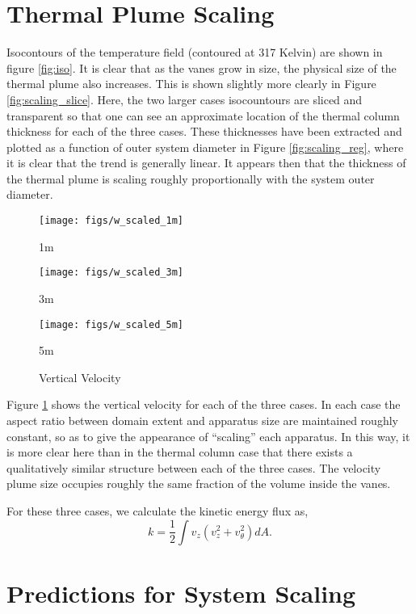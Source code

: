 \documentclass[english]{article}
\begin{document}
\section*{Thermal Plume Scaling}

Isocontours of the temperature field (contoured at 317 Kelvin) are shown in figure \ref{fig:iso}. 
It is clear that as the vanes grow in size, the physical size of the thermal plume also increases. This is shown slightly more clearly in
 Figure \ref{fig:scaling_slice}. Here, the two larger cases isocountours are sliced and transparent so that one can see an approximate 
location of the thermal column thickness for each of the three cases. These thicknesses have been extracted and plotted as a 
function of outer system diameter in Figure \ref{fig:scaling_reg}, where it is clear that the trend is generally linear. It appears then that 
the thickness of the thermal plume is scaling roughly proportionally with the system outer diameter. 

%
%


\begin{figure}[!htb]
\texttt{[image: figs/w\_scaled\_1m]}
\caption*{1m}\label{fig:1m_vz}
\endminipage\hfill
{}
\texttt{[image: figs/w\_scaled\_3m]}
\caption*{3m}\label{fig:3m_vz}
\endminipage\hfill
{}%
\texttt{[image: figs/w\_scaled\_5m]}
  \caption*{5m}\label{fig:5m_vz}
\endminipage
\caption{Vertical Velocity}
\label{fig:vz_scaling}
\end{figure}
 
Figure \ref{fig:vz_scaling} shows the vertical velocity for each of the three cases. In each case the aspect ratio between domain extent
and apparatus size are maintained roughly constant, so as to give the appearance of ``scaling'' each apparatus. In this way, it is more 
clear here than in the thermal column case that there exists a qualitatively similar structure between each of the three cases. The velocity plume 
size occupies roughly the same fraction of the volume inside the vanes. 

For these three cases, we calculate the kinetic energy flux as, 
\begin{equation}
k = \frac{1}{2} \int v_z (v_z^2 + v_{\theta}^2) dA. 
\label{ke_flux}
\end{equation}

%
%
%
\section*{Predictions for System Scaling}
\end{document}
